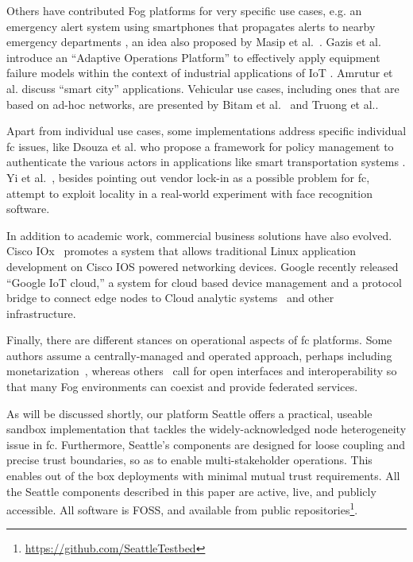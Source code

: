 Others have contributed Fog platforms for very specific use cases, e.g.
an emergency alert system using smartphones that propagates alerts to nearby
emergency departments \cite{7134091}, an idea also proposed by Masip
et al.~\cite{masip-bruin_foggy_2016}. Gazis et al. introduce an ``Adaptive
Operations Platform'' to effectively apply equipment failure models within the
context of industrial applications of
\gls{IoT} \cite{gazis_components_2015}.
Amrutur et al.\cite{amrutur_open_2017} discuss ``smart city''
applications. Vehicular use cases, including ones that are based on
ad-hoc networks, are presented by Bitam et al.~\cite{bitam_vanet-cloud:_2015}
and Truong et al.\cite{truong_software_2015}.

Apart from individual use cases, some implementations address specific individual
\gls{fc} issues, like Dsouza et al. who propose a framework for
policy management to authenticate the various actors in applications
like smart
transportation systems \cite{dsouza_policy-driven_2014}.
Yi et al.~\cite{yi_fog_2015}, besides pointing out vendor lock-in
as a possible problem for \gls{fc}, attempt to exploit locality
in a real-world experiment with face recognition software.

In addition to academic work, commercial business solutions have also evolved.
Cisco IOx~\cite{cisco_iox} promotes a
system that allows traditional Linux application development on
Cisco IOS powered networking devices.
Google recently released ``Google \gls{IoT} cloud,'' a system for
cloud based device management and a protocol bridge to connect edge nodes to
Cloud analytic systems~\cite{google_iot_core} and other infrastructure.

Finally, there are different stances on operational aspects of
\gls{fc} platforms. Some authors assume a centrally-managed and
operated approach, perhaps including monetarization~\cite{mahmud_fog_2016,7868354}, whereas others~\cite{belli_design_2015}
call for open interfaces and interoperability so that many
Fog environments can coexist and provide federated services.

As will be discussed shortly, our platform Seattle offers a practical,
useable sandbox implementation that tackles the widely-acknowledged
node heterogeneity issue in \gls{fc}. Furthermore, Seattle's components
are designed for loose coupling and precise trust boundaries, so as to
enable multi-stakeholder operations. This enables out of the box deployments with
minimal mutual trust requirements.
All the Seattle components described in this paper are active, live, and
publicly accessible. All software is
\acrlong{FOSS}, and available from public
repositories\footnote{\url{https://github.com/SeattleTestbed}}.


